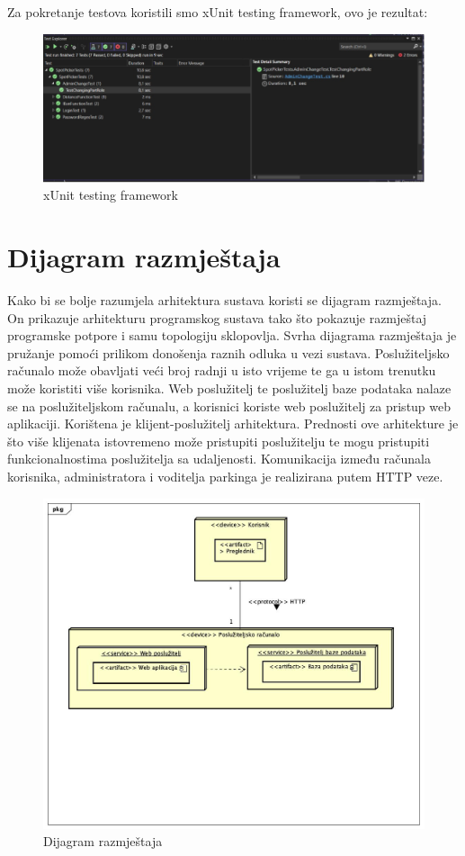 			 
			 
			 
			 {Za pokretanje testova koristili smo xUnit testing framework, ovo je rezultat:}
			 
			 
			 
			 
			 \begin{figure}[hbt!]
			 	\centering
			 	\includegraphics[width=0.7\linewidth]{slike/slikica6.png}
			 	\caption{xUnit testing framework}
			 	\label{fig:slikica6}
			 \end{figure}
			 
			 
			
			\eject 
		
		
		\section{Dijagram razmještaja}
			
			
			
			 {Kako bi se bolje razumjela arhitektura sustava koristi se dijagram razmještaja. On prikazuje arhitekturu programskog sustava tako što pokazuje razmještaj programske potpore i samu topologiju sklopovlja. Svrha dijagrama razmještaja je pružanje pomoći prilikom donošenja raznih odluka u vezi sustava. Poslužiteljsko računalo može obavljati veći broj radnji u isto vrijeme te ga u istom trenutku može koristiti više korisnika. Web poslužitelj te poslužitelj baze podataka nalaze se na poslužiteljskom računalu, a korisnici koriste web poslužitelj za pristup web aplikaciji. Korištena je klijent-poslužitelj arhitektura. Prednosti ove arhitekture je što više klijenata istovremeno može pristupiti poslužitelju te mogu pristupiti funkcionalnostima poslužitelja sa udaljenosti. Komunikacija između računala korisnika, administratora i voditelja parkinga je realizirana putem HTTP veze.}
			 
			 \begin{figure}[hbt!]
			 	\centering
			 	\includegraphics[width=0.7\linewidth]{slike/DijagramRazmjestaja.png}
			 	\caption{Dijagram razmještaja}
			 	\label{fig:DijagramRazmjestaja}
			 \end{figure}
			
